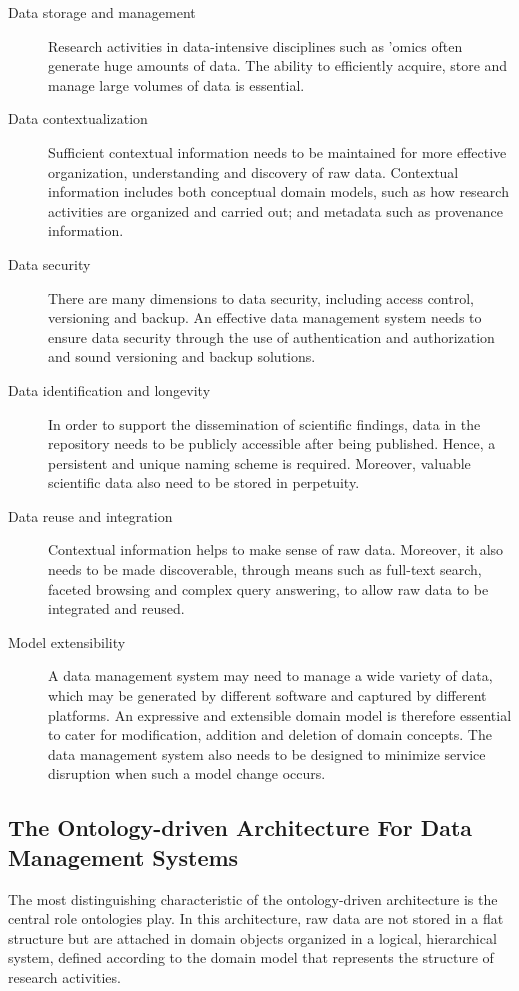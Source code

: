 \documentclass{elsarticle}
\begin{document}
\begin{description}
\item [Data storage and management]
Research activities in data-intensive disciplines such as
'omics often generate huge amounts of data. The ability to efficiently acquire, store and
manage large volumes of data is essential.

\item [Data contextualization]
Sufficient contextual information needs to be maintained for
more effective organization, understanding and discovery of raw data.
Contextual information includes both conceptual
domain models, such as how research activities are organized
and carried out; and metadata such as provenance information.

\item [Data security]
There are many dimensions to data security, including access control,
versioning and backup. An effective data management system needs to
ensure data security through the use of authentication and
authorization and sound versioning and backup solutions.

\item [Data identification and longevity] In order to support the
dissemination of scientific findings, data in the repository needs
to be publicly accessible after being published. Hence, a persistent
and unique naming scheme is required. Moreover, valuable scientific
data also need to be stored in perpetuity.

\item [Data reuse and integration]
Contextual information helps to make sense of raw data.
Moreover, it also needs to be made discoverable,
through means such as full-text search, faceted browsing
and complex query answering, to allow raw data to be integrated and reused.

\item [Model extensibility]
A data management system may need to manage a wide
variety of data, which may be generated by different software
and captured by different platforms. An expressive and extensible
domain model is therefore essential to cater for modification,
addition and deletion of domain concepts. The data management
system also needs to be designed to minimize service disruption
when such a model change occurs.

\end{description}

\subsection{The Ontology-driven Architecture For Data Management Systems}
The most distinguishing characteristic of the ontology-driven architecture
is the central role ontologies play. In this architecture,
raw data are not stored in a flat structure but are attached in
domain objects organized in a logical, hierarchical
system, defined according to the domain model that
represents the structure of research activities.
\end{document}
